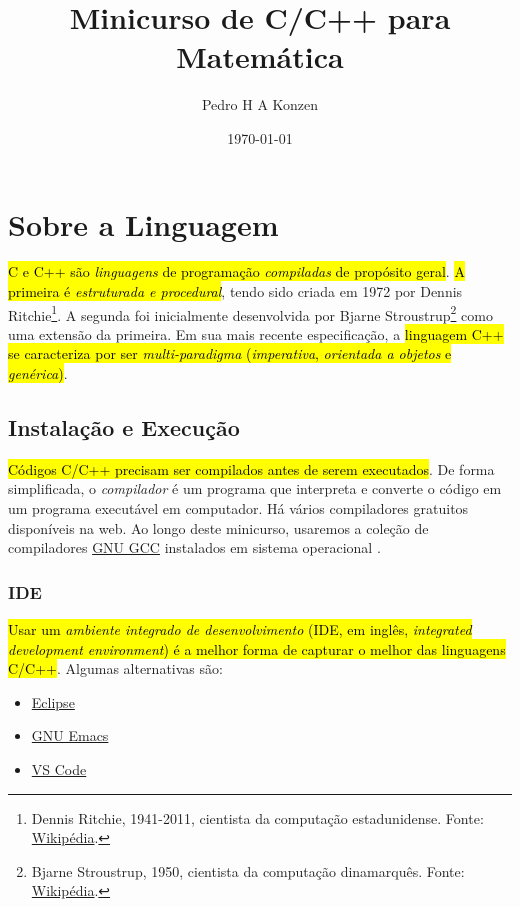 \documentclass[12pt]{article}
\begin{document}
\title{Minicurso de C/C++ para Matemática}
\author{Pedro H A Konzen}
\date{\today}

\maketitle

\tableofcontents



\section{Sobre a Linguagem}\label{sec_sobrepy}

\hl{C e C++ são \emph{linguagens} de programação \emph{compiladas} de propósito geral}. \hl{A primeira é \emph{estruturada e procedural}}, tendo sido criada em 1972 por Dennis Ritchie\footnote{Dennis Ritchie, 1941-2011, cientista da computação estadunidense. Fonte: \href{https://pt.wikipedia.org/wiki/Dennis_Ritchie}{Wikipédia}.}. A segunda foi inicialmente desenvolvida por Bjarne Stroustrup\footnote{Bjarne Stroustrup, 1950, cientista da computação dinamarquês. Fonte: \href{https://pt.wikipedia.org/wiki/Bjarne_Stroustrup}{Wikipédia}.} como uma extensão da primeira. Em sua mais recente especificação, a \hl{linguagem C++ se caracteriza por ser \emph{multi-paradigma} (\emph{imperativa}, \emph{orientada a objetos} e \emph{genérica})}.

\subsection{Instalação e Execução}

\hl{Códigos C/C++ precisam ser compilados antes de serem executados}. De forma simplificada, o \emph{compilador} é um programa que interpreta e converte o código em um programa executável em computador. Há vários compiladores gratuitos disponíveis na web. Ao longo deste minicurso, usaremos a coleção de compiladores \href{https://gcc.gnu.org/}{GNU GCC} instalados em sistema operacional {\linux}.

\subsubsection{IDE}

\hl{Usar um \emph{ambiente integrado de desenvolvimento} (IDE, em inglês, \textit{integrated development environment}) é a melhor forma de capturar o melhor das linguagens C/C++}. Algumas alternativas são:
\begin{itemize}
\item \href{https://www.eclipse.org/ide/}{Eclipse}
\item \href{https://www.gnu.org/software/emacs/download.html}{GNU Emacs}
\item \href{https://code.visualstudio.com/}{VS Code}
\end{itemize}
\end{document}

